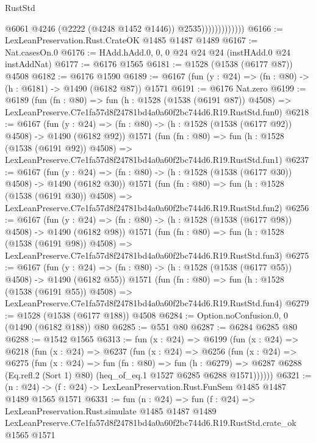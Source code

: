 \begin{lexlean}{RustStd}
\begin{coremodule}
                              @6061
                              @4246
                              (@2222 (@4248 @1452 @1446))
                              @2535)))))))))))))
@6166 := LexLeanPreservation.Rust.CrateOK @1485 @1487 @1489
@6167 := Nat.casesOn.{0}
@6176 := HAdd.hAdd.{0, 0, 0} @24 @24 @24 (instHAdd.{0} @24 instAddNat)
@6177 := @6176 @1565
@6181 := @1528 (@1538 (@6177 @87)) @4508
@6182 := @6176 @1590
@6189 := @6167 (fun (y : @24) => (fn : @80) -> (h : @6181) -> @1490 (@6182 @87)) @1571
@6191 := @6176 Nat.zero
@6199 := @6189
    (fun (fn : @80) =>
    fun (h : @1528 (@1538 (@6191 @87)) @4508) =>
    LexLeanPreserve.C7e1fa57d8f24781bd4a0a60f2bc744d6.R19.RustStd.fun0)
@6218 := @6167
    (fun (y : @24) => (fn : @80) -> (h : @1528 (@1538 (@6177 @92)) @4508) -> @1490 (@6182 @92))
    @1571
    (fun (fn : @80) =>
    fun (h : @1528 (@1538 (@6191 @92)) @4508) =>
    LexLeanPreserve.C7e1fa57d8f24781bd4a0a60f2bc744d6.R19.RustStd.fun1)
@6237 := @6167
    (fun (y : @24) => (fn : @80) -> (h : @1528 (@1538 (@6177 @30)) @4508) -> @1490 (@6182 @30))
    @1571
    (fun (fn : @80) =>
    fun (h : @1528 (@1538 (@6191 @30)) @4508) =>
    LexLeanPreserve.C7e1fa57d8f24781bd4a0a60f2bc744d6.R19.RustStd.fun2)
@6256 := @6167
    (fun (y : @24) => (fn : @80) -> (h : @1528 (@1538 (@6177 @98)) @4508) -> @1490 (@6182 @98))
    @1571
    (fun (fn : @80) =>
    fun (h : @1528 (@1538 (@6191 @98)) @4508) =>
    LexLeanPreserve.C7e1fa57d8f24781bd4a0a60f2bc744d6.R19.RustStd.fun3)
@6275 := @6167
    (fun (y : @24) => (fn : @80) -> (h : @1528 (@1538 (@6177 @55)) @4508) -> @1490 (@6182 @55))
    @1571
    (fun (fn : @80) =>
    fun (h : @1528 (@1538 (@6191 @55)) @4508) =>
    LexLeanPreserve.C7e1fa57d8f24781bd4a0a60f2bc744d6.R19.RustStd.fun4)
@6279 := @1528 (@1538 (@6177 @188)) @4508
@6284 := Option.noConfusion.{0, 0} (@1490 (@6182 @188)) @80
@6285 := @551 @80
@6287 := @6284 @6285 @80
@6288 := @1542 @1565
@6313 := fun (x : @24) =>
  @6199
    (fun (x : @24) =>
    @6218
      (fun (x : @24) =>
      @6237
        (fun (x : @24) =>
        @6256
          (fun (x : @24) =>
          @6275
            (fun (x : @24) =>
            fun (fn : @80) =>
            fun (h : @6279) =>
            @6287 @6288 (Eq.refl.{2} (Sort 1) @80) (heq_of_eq.{1} @1527 @6285 @6288 @1571))))))
@6321 := (n : @24) -> (f : @24) -> LexLeanPreservation.Rust.FunSem @1485 @1487 @1489 @1565 @1571
@6331 := fun (n : @24) =>
  fun (f : @24) =>
  LexLeanPreservation.Rust.simulate
    @1485
    @1487
    @1489
    LexLeanPreserve.C7e1fa57d8f24781bd4a0a60f2bc744d6.R19.RustStd.crate_ok
    @1565
    @1571
\end{coremodule}
\end{lexlean}
